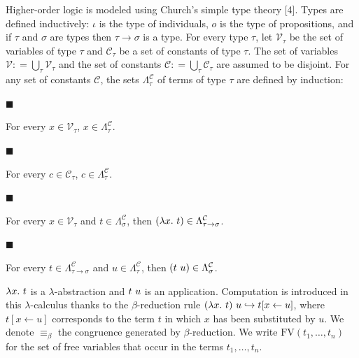  
Higher-order logic is modeled using Church’s simple type theory [4]. Types are defined inductively: $\iota$ is the type of individuals, $o$ is the type of propositions, and if $\tau$ and $\sigma$ are types then $\tau\rightarrow\sigma$ is a type. For every type $\tau$, let $\mathcal{V}_{\tau}$ be the set of variables of type $\tau$ and $\mathcal{C}_{\tau}$ be a set of constants of type $\tau$. The set of variables $\mathcal{V}\mathrel{\mathop{:}}=\bigcup_{\tau}\mathcal{V}_{\tau}$ and the set of constants $\mathcal{C}\mathrel{\mathop{:}}=\bigcup_{\tau}\mathcal{C}_{\tau}$ are assumed to be disjoint. For any set of constants $\mathcal{C}$, the sets $\Lambda^{\mathcal{C}}_{\tau}$ of terms of type $\tau$ are defined by induction:\par
  
\par\noindent  $\blacksquare$ 
 
For every $x\in\mathcal{V}_{\tau}$, $x\in\Lambda^{\mathcal{C}}_{\tau}$.\par
 
 
 
\par\noindent  $\blacksquare$ 
 
For every $c\in\mathcal{C}_{\tau}$, $c\in\Lambda^{\mathcal{C}}_{\tau}$.\par
 
 
 
\par\noindent  $\blacksquare$ 
 
For every $x\in\mathcal{V}_{\tau}$ and $t\in\Lambda^{\mathcal{C}}_{\sigma}$, then $(\lambda x.\leavevmode\nobreak\ t)\in\Lambda^{\mathcal{C}}_{\tau\rightarrow\sigma}$.\par
 
 
 
\par\noindent  $\blacksquare$ 
 
For every $t\in\Lambda^{\mathcal{C}}_{\tau\rightarrow\sigma}$ and $u\in\Lambda^{\mathcal{C}}_{\tau}$, then $(t\leavevmode\nobreak\ u)\in\Lambda^{\mathcal{C}}_{\sigma}$.\par
 
 
  
$\lambda x.\leavevmode\nobreak\ t$ is a $\lambda$-abstraction and $t\leavevmode\nobreak\ u$ is an application. Computation is introduced in this $\lambda$-calculus thanks to the $\beta$-reduction rule $(\lambda x.\leavevmode\nobreak\ t)\leavevmode\nobreak\ u\hookrightarrow t[x\leftarrow u]$, where $t[x\leftarrow u]$ corresponds to the term $t$ in which $x$ has been substituted by $u$. We denote $\equiv_{\beta}$ the congruence generated by $\beta$-reduction. We write $\text{{FV}}(t_{1},\ldots,t_{n})$ for the set of free variables that occur in the terms $t_{1},\ldots,t_{n}$.\par
 

